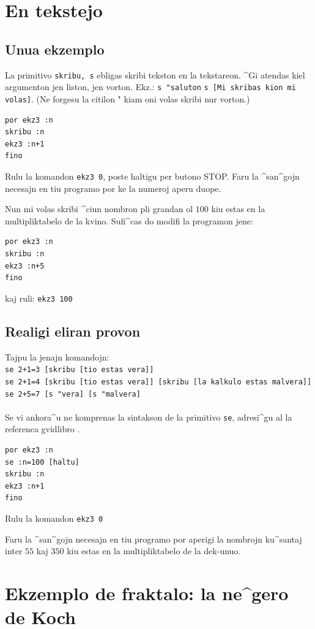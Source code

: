 \section{En tekstejo}
\subsection{Unua ekzemplo}
\noindent La primitivo \texttt{skribu, s} ebligas skribi tekston en la
tekstareon.  ^Gi atendas kiel argumenton jen liston, jen vorton.  Ekz.:
\texttt{s "saluton} \texttt{s [Mi skribas kion mi volas]}.  (Ne
forgesu la citilon " kiam oni volas skribi nur vorton.)
\begin{verbatim}
por ekz3 :n
skribu :n
ekz3 :n+1
fino
\end{verbatim}
Rulu la komandon \texttt{ekz3 0}, poste haltigu per butono STOP.
Faru la ^san^gojn necesajn en tiu programo por ke la numeroj aperu duope.

Nun mi volas skribi ^ciun nombron pli grandan ol $100$ kiu estas en la
multipliktabelo de la kvino.  Sufi^cas do modifi la programon jene:
\begin{verbatim}
por ekz3 :n
skribu :n
ekz3 :n+5
fino
\end{verbatim}
kaj ruli: \texttt{ekz3 100}
\subsection{Realigi eliran provon}
\noindent Tajpu la jenajn komandojn:\\
\texttt{se 2+1=3 [skribu [tio estas vera]]} \\
\texttt{se 2+1=4 [skribu [tio estas vera]] [skribu [la kalkulo estas malvera]]} \\
\texttt{se 2+5=7 [s "vera] [s "malvera]}\\
\\
Se vi ankora^u ne komprenas la sintakson de la primitivo \texttt{se},
adresi^gu al la referenca gvidlibro \xlogo.
\begin{verbatim}
por ekz3 :n
se :n=100 [haltu]
skribu :n
ekz3 :n+1
fino
\end{verbatim}

Rulu la komandon \texttt{ekz3 0}

Faru la ^san^gojn necesajn en tiu programo por aperigi la nombrojn
ku^santaj inter $55$ kaj $350$ kiu estas en la multipliktabelo de la
dek-unuo.

\section{Ekzemplo de fraktalo: la ne^gero de Koch}

